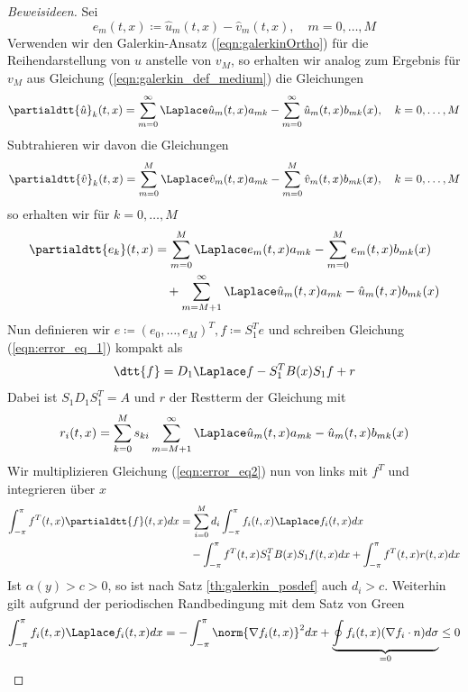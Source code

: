 \begin{proof}[Beweisideen]
Sei 
\[e_m(t,x)\coloneqq \hat{u}_m(t,x)-\hat{v}_m(t,x),\quad m=0,\dots,M\]
Verwenden wir den Galerkin-Ansatz (\ref{eqn:galerkinOrtho}) für die Reihendarstellung von $u$ anstelle von $v_M$, so erhalten wir analog zum Ergebnis für $v_M$ aus Gleichung (\ref{eqn:galerkin_def_medium}) die Gleichungen
\begin{equation}
\partialdtt{\hat{u}}_k(t,x)=\sum_{m=0}^\infty \Laplace \hat{u}_m(t,x)a_{mk}-\sum_{m=0}^\infty \hat{u}_m(t,x)b_{mk}(x),\quad k=0,\dots,M
\end{equation}
Subtrahieren wir davon die Gleichungen
\begin{equation}
\partialdtt{\hat{v}}_k(t,x)=\sum_{m=0}^M\Laplace \hat{v}_m(t,x)a_{mk}-\sum_{m=0}^M\hat{v}_m(t,x)b_{mk}(x),\quad k=0,\dots,M
\end{equation}
so erhalten wir für $k=0,\dots,M$
\begin{equation}
\label{eqn:error_eq_1}
\begin{split}
\partialdtt{e_k}(t,x)&=\sum_{m=0}^M\Laplace e_m(t,x)a_{mk}-\sum_{m=0}^M e_m(t,x)b_{mk}(x)\\
&\quad +\sum_{m=M+1}^\infty \Laplace \hat{u}_m(t,x)a_{mk}-\hat{u}_m(t,x)b_{mk}(x)
\end{split}
\end{equation}
Nun definieren wir $e\coloneqq (e_0,\dots,e_M)^T, f\coloneqq S_1^Te$ und schreiben Gleichung (\ref{eqn:error_eq_1}) kompakt als
\begin{equation}
\label{eqn:error_eq2}
\dtt{f}=D_1\Laplace f-S_1^TB(x)S_1f+r
\end{equation}
Dabei ist $S_1D_1S_1^T=A$ und $r$ der Restterm der Gleichung mit
\[r_{i}(t,x)=\sum_{k=0}^Ms_{ki}\sum_{m=M+1}^\infty \Laplace \hat{u}_m(t,x)a_{mk}-\hat{u}_m(t,x)b_{mk}(x)\]
Wir multiplizieren Gleichung (\ref{eqn:error_eq2}) nun von links mit $f^T$ und integrieren über $x$
\begin{align*}
\int_{-\pi}^\pi f^T(t,x)\partialdtt{f}(t,x)dx&=\sum_{i=0}^M d_i\int_{-\pi}^\pi f_i(t,x)\Laplace f_i(t,x)dx\\
&\quad -\int_{-\pi}^\pi f^T(t,x)S_1^TB(x)S_1f(t,x)dx+\int_{-\pi}^\pi f^T(t,x)r(t,x)dx
\end{align*}
Ist $\alpha(y)>c>0$, so ist nach Satz \ref{th:galerkin_posdef} auch $d_i>c$. Weiterhin gilt aufgrund der periodischen Randbedingung mit dem Satz von Green
\[\int_{-\pi}^\pi f_i(t,x)\Laplace f_i(t,x)dx=-\int_{-\pi}^\pi \norm{\nabla f_i(t,x)}^2dx+\underbrace{\oint f_i(t,x)(\nabla f_i\cdot n)d\sigma}_{=0}\le 0\]

\end{proof}
